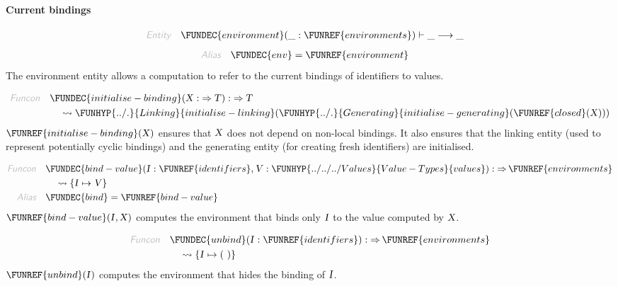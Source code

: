 \paragraph{Current bindings}\hypertarget{current-bindings}{}\label{current-bindings}

\begin{align*}
  \KEY{Entity} \quad
  & \FUNDEC{environment}(\_ : \FUNREF{environments}) \vdash \_ \TRANS  \_
\end{align*}
\begin{align*}
  \KEY{Alias} \quad
  & \FUNDEC{env} = \FUNREF{environment}
\end{align*}
The environment entity allows a computation to refer to the current bindings
  of identifiers to values.

\begin{align*}
  \KEY{Funcon} \quad
  & \FUNDEC{initialise-binding}(
                       \VAR{X} :  \TO \VAR{T}) 
    :  \TO \VAR{T} \\&\quad
    \leadsto \FUNHYP{../.}{Linking}{initialise-linking}
               (  \FUNHYP{../.}{Generating}{initialise-generating}
                       (  \FUNREF{closed}
                               (  \VAR{X} ) ) )
\end{align*}
$\FUNREF{initialise-binding}
    (  \VAR{X} )$ ensures that $\VAR{X}$ does not depend on non-local bindings.
  It also ensures that the linking entity (used to represent potentially cyclic
  bindings) and the generating entity (for creating fresh identifiers) are 
  initialised.

\begin{align*}
  \KEY{Funcon} \quad
  & \FUNDEC{bind-value}(
                       \VAR{I} : \FUNREF{identifiers}, \VAR{V} : \FUNHYP{../../../Values}{Value-Types}{values}) 
    :  \TO \FUNREF{environments} \\&\quad
    \leadsto \{ \VAR{I} \mapsto 
                  \VAR{V} \}
\\
  \KEY{Alias} \quad
  & \FUNDEC{bind} = \FUNREF{bind-value}
\end{align*}
$\FUNREF{bind-value}
    (  \VAR{I}, 
           \VAR{X} )$ computes the environment that binds only $\VAR{I}$ to the value
  computed by $\VAR{X}$.

\begin{align*}
  \KEY{Funcon} \quad
  & \FUNDEC{unbind}(
                       \VAR{I} : \FUNREF{identifiers}) 
    :  \TO \FUNREF{environments} \\&\quad
    \leadsto \{ \VAR{I} \mapsto 
                  (   \  ) \}
\end{align*}
$\FUNREF{unbind}
    (  \VAR{I} )$ computes the environment that hides the binding of $\VAR{I}$.

